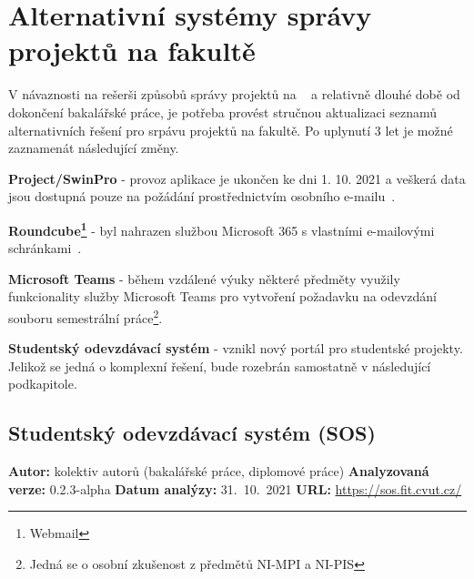 \section{Alternativní systémy správy projektů na fakultě}

V návaznosti na rešerši způsobů správy projektů na  ~\cite{bachelorthesis} a relativně dlouhé době od dokončení bakalářské práce, je potřeba provést stručnou aktualizaci seznamů alternativních řešení pro srpávu projektů na fakultě.
Po uplynutí 3 let je možné zaznamenát následující změny.

\begin{ul}
   \item
   \textbf{Project/SwinPro} - provoz aplikace je ukončen ke dni 1. 10. 2021 a veškerá data jsou dostupná pouze na požádání prostřednictvím osobního e-mailu~\cite{swinpro}.
   \item
   \textbf{Roundcube\footnote{Webmail}} - byl nahrazen službou Microsoft 365 s vlastními e-mailovými schránkami~\cite{emailsfitcvut}.
   \item
   \textbf{Microsoft Teams} - během vzdálené výuky některé předměty využily funkcionality služby Microsoft Teams pro vytvoření požadavku na odevzdání souboru semestrální práce\footnote{Jedná se o osobní zkušenost z předmětů NI-MPI a NI-PIS}.
   \item
   \textbf{Studentský odevzdávací systém} - vznikl nový portál pro studentské projekty.
   Jelikož se jedná o komplexní řešení, bude rozebrán samostatně v následující podkapitole.
\end{ul}



\subsection{Studentský odevzdávací systém (SOS)}

\textbf{Autor:} kolektiv autorů (bakalářské práce, diplomové práce)\newline
\textbf{Analyzovaná verze:} 0.2.3-alpha\newline
\textbf{Datum analýzy:} 31.~10.~2021\newline
\textbf{URL:} \url{https://sos.fit.cvut.cz/}

